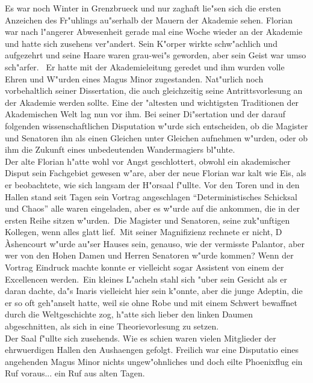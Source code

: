 \documentclass[a5paper,8pt]{book}
\begin{document}
Es war noch Winter in Grenzbrueck und nur zaghaft lie"sen sich die ersten Anzeichen des Fr"uhlings au"serhalb der Mauern der Akademie sehen. Florian war nach l"angerer 
Abwesenheit gerade mal eine Woche wieder an der Akademie und hatte sich zusehens ver"andert. Sein K"orper wirkte schw"achlich und aufgezehrt und seine Haare waren grau-wei"s 
geworden, aber sein Geist war umso sch"arfer. \
Er hatte mit der Akademieleitung geredet und ihm wurden volle Ehren und W"urden eines Magus Minor zugestanden. Nat"urlich noch vorbehaltlich seiner Dissertation, die auch 
gleichzeitig seine Antrittsvorlesung an der Akademie werden sollte. Eine der "altesten und wichtigsten Traditionen der Akademischen Welt lag nun vor ihm. Bei seiner 
Di"sertation und der darauf folgenden wissenschaftlichen Disputation w"urde sich entscheiden, ob die Magister und Senatoren ihn als einen Gleichen unter Gleichen aufnehmen 
w"urden, oder ob ihm die Zukunft eines unbedeutenden Wandermagiers bl"uhte.\\

Der alte Florian h"atte wohl vor Angst geschlottert, obwohl ein akademischer Disput sein Fachgebiet gewesen w"are, aber der neue Florian war kalt wie Eis, als er beobachtete, 
wie sich langsam der H"orsaal f"ullte. Vor den Toren und in den Hallen stand seit Tagen sein Vortrag angeschlagen ``Deterministisches Schicksal und Chaos'' alle waren eingeladen, 
aber es w"urde auf die ankommen, die in der ersten Reihe sitzen w"urden.\
Die Magister und Senatoren, seine zuk"unftigen Kollegen, wenn alles glatt lief.\
Mit seiner Magnifizienz rechnete er nicht, D \`{A}shencourt w"urde au"ser Hauses sein, genauso, wie der vermisste Palantor, aber wer von den Hohen Damen und Herren Senatoren 
w"urde kommen? Wenn der Vortrag Eindruck machte konnte er vielleicht sogar Assistent von einem der Excellencen werden.\
Ein kleines L"acheln stahl sich "uber sein Gesicht als er daran dachte, da"s Inaris vielleicht hier sein k"onnte, aber die junge Adeptin, die er so oft geh"anselt hatte, weil 
sie ohne Robe und mit einem Schwert bewaffnet durch die Weltgeschichte zog, h"atte sich lieber den linken Daumen abgeschnitten, als sich in eine Theorievorlesung zu setzen.\\

Der Saal f"ullte sich zusehends. Wie es schien waren vielen Mitglieder der ehrwuerdigen Hallen den Aushaengen gefolgt. Freilich war eine Disputatio eines angehenden Magus 
Minor nichts ungew"ohnliches und doch eilte Phoenixflug ein Ruf voraus... ein Ruf aus alten Tagen.\\
\end{document}
